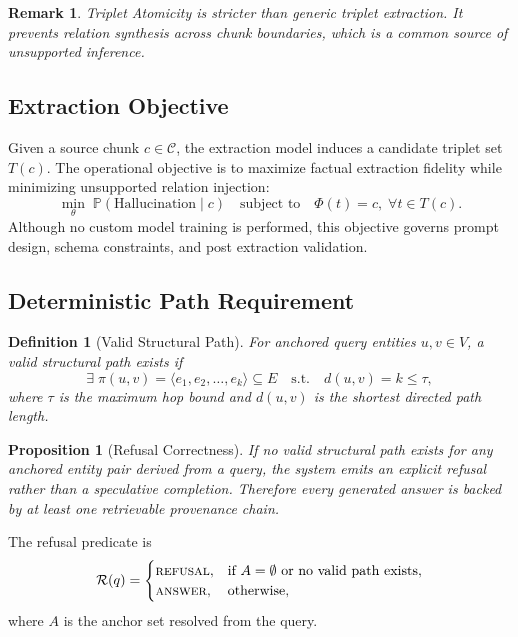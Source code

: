 \documentclass[conference]{IEEEtran}
\newtheorem{definition}{Definition}
\newtheorem{proposition}{Proposition}
\newtheorem{remark}{Remark}
\begin{document}
\begin{remark}
Triplet Atomicity is stricter than generic triplet extraction. It prevents relation synthesis across chunk boundaries, which is a common source of unsupported inference.
\end{remark}

\subsection{Extraction Objective}
Given a source chunk $c \in \mathcal{C}$, the extraction model induces a candidate triplet set $T(c)$. The operational objective is to maximize factual extraction fidelity while minimizing unsupported relation injection:
\begin{equation}
  \min_{\theta} \; \mathbb{P}(\text{Hallucination} \mid c)
  \quad \text{subject to} \quad \Phi(t)=c, \; \forall t \in T(c).
\end{equation}
Although no custom model training is performed, this objective governs prompt design, schema constraints, and post extraction validation.

\subsection{Deterministic Path Requirement}
\begin{definition}[Valid Structural Path]
For anchored query entities $u,v \in V$, a valid structural path exists if
\begin{equation}
  \exists\; \pi(u,v) = \langle e_1, e_2, \ldots, e_k \rangle \subseteq E
  \quad \text{s.t.} \quad d(u,v)=k \leq \tau,
\end{equation}
where $\tau$ is the maximum hop bound and $d(u,v)$ is the shortest directed path length.
\end{definition}

\begin{proposition}[Refusal Correctness]
If no valid structural path exists for any anchored entity pair derived from a query, the system emits an explicit refusal rather than a speculative completion. Therefore every generated answer is backed by at least one retrievable provenance chain.
\end{proposition}

The refusal predicate is
\begin{equation}
  \mathcal{R}(q) =
  \begin{cases}
    \textsc{refusal}, & \text{if } A = \emptyset \text{ or no valid path exists},\\
    \textsc{answer}, & \text{otherwise},
  \end{cases}
\end{equation}
where $A$ is the anchor set resolved from the query.
\end{document}

